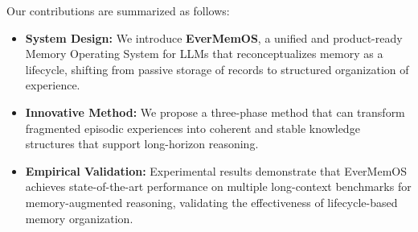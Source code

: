 Our contributions are summarized as follows:
\begin{itemize}
    \item \textbf{System Design:} We introduce \textbf{EverMemOS}, a unified and product-ready Memory Operating System for LLMs that reconceptualizes memory as a lifecycle, shifting from passive storage of records to structured organization of experience.
    \item \textbf{Innovative Method:} We propose a three-phase method 
    that can transform fragmented episodic experiences into coherent and stable knowledge structures that support long-horizon reasoning.
    \item \textbf{Empirical Validation:} Experimental results demonstrate that EverMemOS achieves state-of-the-art performance on multiple long-context benchmarks for memory-augmented reasoning, validating the effectiveness of lifecycle-based memory organization.
\end{itemize}
